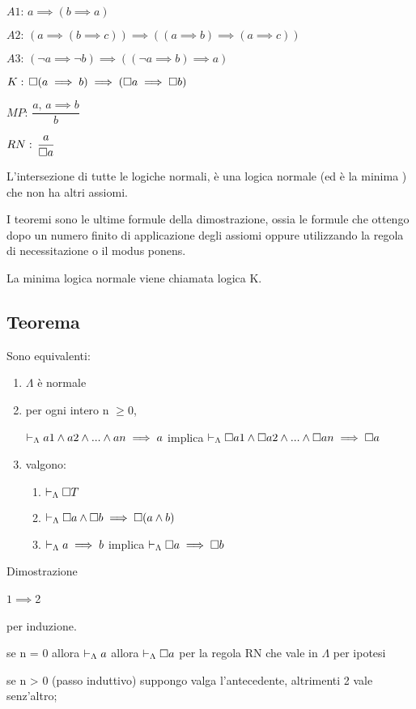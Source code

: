 $A1:\, a\implies(b\implies a)$

$A2:\,(a\implies(b\implies c))\implies((a\implies b)\implies(a\implies c))$

$A3:\,(\neg a\implies\neg b)\implies((\neg a\implies b)\implies a)$

$K:\,\square(a\implies b)\implies(\square a\implies\square b)$

$MP:\,\dfrac{a,\, a\implies b}{b}$

$RN:\,\dfrac{a}{\square a}$

L'intersezione di tutte le logiche normali, è una logica normale (ed
è la minima ) che non ha altri assiomi.

I teoremi sono le ultime formule della dimostrazione, ossia le formule
che ottengo dopo un numero finito di applicazione degli assiomi oppure
utilizzando la regola di necessitazione o il modus ponens.

La minima logica normale viene chiamata logica K.


\subsection{Teorema}

Sono equivalenti: 
\begin{enumerate}
\item $\Lambda$ è normale 
\item per ogni intero n $\geq0$,


$\vdash_{\Lambda}a1\wedge a2\wedge...\wedge an\implies a$ implica $\vdash_{\Lambda}\square a1\wedge\square a2\wedge...\wedge\square a n\implies\square a$

\item valgono:

\begin{enumerate}
\item $\vdash_{\Lambda}\square T$ 
\item $\vdash_{\Lambda}\square a\wedge\square b\implies\square(a\wedge b)$ 
\item $\vdash_{\Lambda}a\implies b$ implica $\vdash_{\Lambda}\square a\implies\square b$ 
\end{enumerate}
\end{enumerate}
Dimostrazione

$1\implies$2

per induzione.

se n = 0 allora $\vdash_{\Lambda}a$ allora $\vdash_{\Lambda}\square a$ per la regola
RN che vale in $\Lambda$ per ipotesi

se n > 0 (passo induttivo) suppongo valga l'antecedente, altrimenti
2 vale senz'altro;

